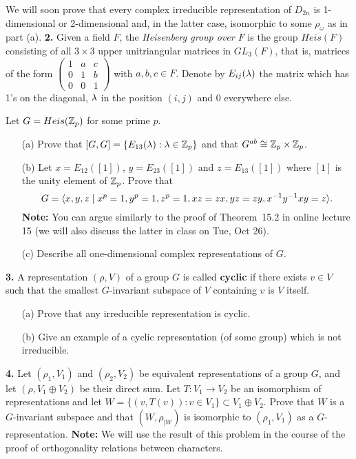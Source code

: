 \documentclass[12pt]{article}
\begin{document}
We will soon prove that every complex irreducible representation of $D_{2n}$ is 1-dimensional or 2-dimensional and, in the latter case,
isomorphic to some $\rho_{\omega}$ as in part (a).
\skv
{\bf 2.} Given a field $F$, the \emph{Heisenberg group over $F$} is the group $Heis(F)$ consisting of all $3\times 3$ upper unitriangular matrices in $GL_3(F)$, that is, matrices of the form $\begin{pmatrix}1&a&c\\ 0& 1& b\\ 0&0&1\end{pmatrix}$
with $a,b,c\in F$. Denote by $E_{ij}({\lambda})$ the matrix which has 1's on the diagonal, ${\lambda}$ in the position $(i,j)$ and $0$
everywhere else.

Let $G=Heis({\mathbb Z}_p)$ for some prime $p$.
\begin{itemize}
\item[(a)] Prove that $[G,G]=\{E_{13}({\lambda}):{\lambda}\in {\mathbb Z}_p\}$ and that 
$G^{ab}\cong {\mathbb Z}_p\times {\mathbb Z}_p$.
\item[(b)] Let $x=E_{12}([1])$, $y=E_{23}([1])$ and $z=E_{13}([1])$ where $[1]$ is the unity element of ${\mathbb Z}_p$. Prove that $$G={\langle} x,y,z \mid x^p=1, y^p=1, z^p=1, xz=zx, yz=zy, x^{-1}y^{-1}xy=z{\rangle}.$$
{\bf Note:} You can argue similarly to the proof of Theorem~15.2 in online lecture 15 (we will also discuss the latter in class on Tue, Oct 26).
\item[(c)] Describe all one-dimensional complex representations of $G$.  
\end{itemize}


{\bf 3.} A representation $(\rho, V)$ of a group $G$ is called {\bf cyclic} if there exists $v\in V$ such that the smallest 
$G$-invariant subspace of $V$ containing $v$ is $V$ itself.
\begin{itemize}
\item[(a)] Prove that any irreducible representation is cyclic.
\item[(b)] Give an example of a cyclic representation (of some group) which is not irreducible.
\end{itemize}
\skv
{\bf 4.} Let $(\rho_1,V_1)$ and $(\rho_2,V_2)$ be equivalent representations of a group $G$, and let $(\rho,V_1\oplus V_2)$ be their direct sum. Let $T:V_1\to V_2$ be an isomorphism of representations and let $W=\{(v,T(v)): v\in V_1\}\subset V_1\oplus V_2$. Prove that
$W$ is a $G$-invariant subspace and that $(W,\rho_{|W})$ is isomorphic to $(\rho_1,V_1)$ as a $G$-representation. {\bf Note:} We will
use the result of this problem in the course of the proof of orthogonality relations between characters.
\skv
\end{document}
